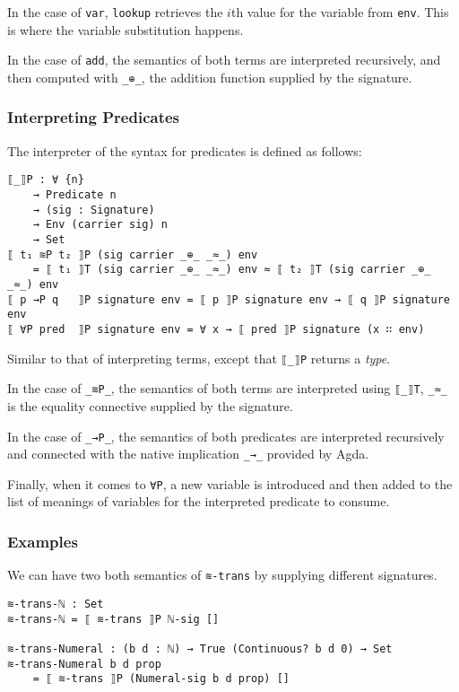 \documentclass[\main/thesis.tex]{subfiles}
\begin{document}
In the case of \lstinline|var|,
\lstinline|lookup| retrieves the $i$th value for the variable from \lstinline|env|.
This is where the variable substitution happens.

In the case of \lstinline|add|,
the semantics of both terms are interpreted recursively,
and then computed with \lstinline|_⊕_|,
the addition function supplied by the signature.

\subsubsection{Interpreting Predicates}

The interpreter of the syntax for predicates is defined as follows:

\begin{lstlisting}[basicstyle=\ttfamily\scriptsize]
⟦_⟧P : ∀ {n}
    → Predicate n
    → (sig : Signature)
    → Env (carrier sig) n
    → Set
⟦ t₁ ≋P t₂ ⟧P (sig carrier _⊕_ _≈_) env
    = ⟦ t₁ ⟧T (sig carrier _⊕_ _≈_) env ≈ ⟦ t₂ ⟧T (sig carrier _⊕_ _≈_) env
⟦ p →P q   ⟧P signature env = ⟦ p ⟧P signature env → ⟦ q ⟧P signature env
⟦ ∀P pred  ⟧P signature env = ∀ x → ⟦ pred ⟧P signature (x ∷ env)
\end{lstlisting}

Similar to that of interpreting terms, except that \lstinline|⟦_⟧P| returns a
\textit{type}.

In the case of \lstinline|_≋P_|,
the semantics of both terms are interpreted using \lstinline|⟦_⟧T|,
\lstinline|_≈_| is the equality connective supplied by the signature.

In the case of \lstinline|_→P_|,
the semantics of both predicates are interpreted recursively
and connected with the native implication \lstinline|_→_| provided by Agda.

Finally, when it comes to \lstinline|∀P|,
a new variable is introduced and then added to the list of meanings of variables
for the interpreted predicate to consume.

\subsubsection{Examples}

We can have two both semantics of \lstinline|≋-trans| by supplying different
signatures.

\begin{lstlisting}
≋-trans-ℕ : Set
≋-trans-ℕ = ⟦ ≋-trans ⟧P ℕ-sig []

≋-trans-Numeral : (b d : ℕ) → True (Continuous? b d 0) → Set
≋-trans-Numeral b d prop
    = ⟦ ≋-trans ⟧P (Numeral-sig b d prop) []
\end{lstlisting}
\end{document}

